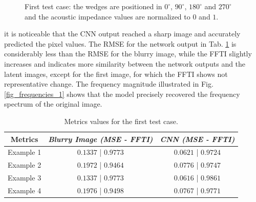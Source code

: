 \documentclass[conference]{IEEEtran}
\begin{document}
\begin{figure}[!t]
{\label{fig_second_case_cnn}}
\caption{First test case: the wedges are positioned in 
$0^{\circ}$, $90^{\circ}$, $180^{\circ}$ and $270^{\circ}$ and the acoustic impedance values are normalized to $0$ and $1$.}
\label{fig_scenario1}
\end{figure}
it is noticeable that the CNN output reached a sharp image and accurately
predicted the pixel values. The RMSE for the network output in Tab. \ref{table_caso_1} is considerably less than the RMSE for the blurry image,
while the FFTI slightly increases and indicates more similarity between the network outputs
and the latent images, except for the first image, for which the FFTI shows not representative change.
The frequency magnitude illustrated in Fig. \ref{fig_frequencies_1}
shows that the model precisely recovered the frequency spectrum of the original image.
\begin{table}[!t]
\renewcommand{\arraystretch}{1.2}
\caption{Metrics values for the first test case.}
\label{table_caso_1}
\centering
\begin{tabular}{|c||c||c|}
\hline
 \textbf{Metrics} & \textbf{\textit{Blurry Image (MSE - FFTI)}} & \textbf{\textit{CNN (MSE - FFTI)}}\\
\hline
Example 1 & $0.1337$ | $0.9773$ & $0.0621$ | $0.9724$\\
\hline
Example 2 & $0.1972$ | $0.9464$ & $0.0776$ | $0.9747$\\
\hline
Example 3 & $0.1337$ | $0.9773$ & $0.0616$ | $0.9861$\\
\hline
Example 4 & $0.1976$ | $0.9498$ & $0.0767$ | $0.9771$\\
\hline
\end{tabular}
\end{table}
\end{document}
